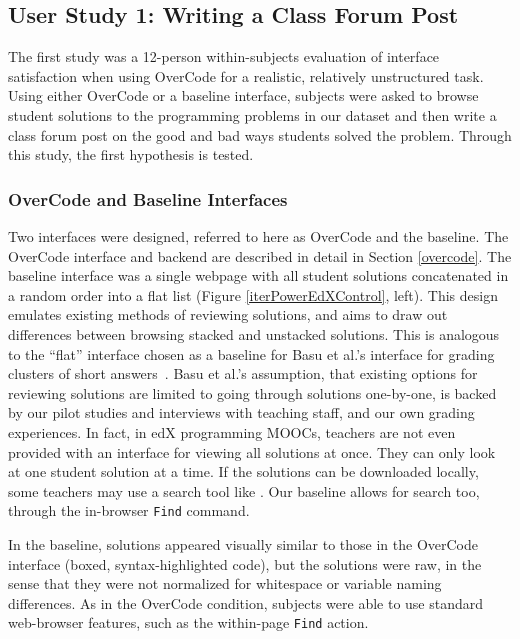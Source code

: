 \subsection{User Study 1: Writing a Class Forum Post}

The first study was a 12-person within-subjects evaluation of interface satisfaction when using OverCode for a realistic, relatively unstructured task. Using either OverCode or a baseline interface, subjects were asked to browse student solutions to the programming problems in our dataset and then write a class forum post on the good and bad ways students solved the problem. Through this study, the first hypothesis is tested.

\subsubsection{OverCode and Baseline Interfaces}

Two interfaces were designed, referred to here as OverCode and the baseline. The OverCode interface and backend are described in detail in Section \ref{overcode}. The baseline interface was a single webpage with all student solutions concatenated in a random order into a flat list (Figure \ref{iterPowerEdXControl}, left). This design emulates existing methods of reviewing solutions, and aims to draw out differences between browsing stacked and unstacked solutions. This is analogous to the ``flat'' interface chosen as a baseline for Basu et al.'s interface for grading clusters of short answers~\cite{basuDivideAndConquer}. Basu et al.'s assumption, that existing options for reviewing solutions are limited to going through solutions one-by-one, is backed by our pilot studies and interviews with teaching staff, and our own grading experiences. In fact, in edX programming MOOCs, teachers are not even provided with an interface for viewing all solutions at once. They can only look at one student solution at a time. If the solutions can be downloaded locally, some teachers may use a search tool like . Our baseline allows for search too, through the in-browser \texttt{Find} command. 

In the baseline, solutions appeared visually similar to those in the OverCode interface (boxed, syntax-highlighted code), but the solutions were raw, in the sense that they were not normalized for whitespace or variable naming differences. As in the OverCode condition, subjects were able to use standard web-browser features, such as the within-page \texttt{Find} action.


